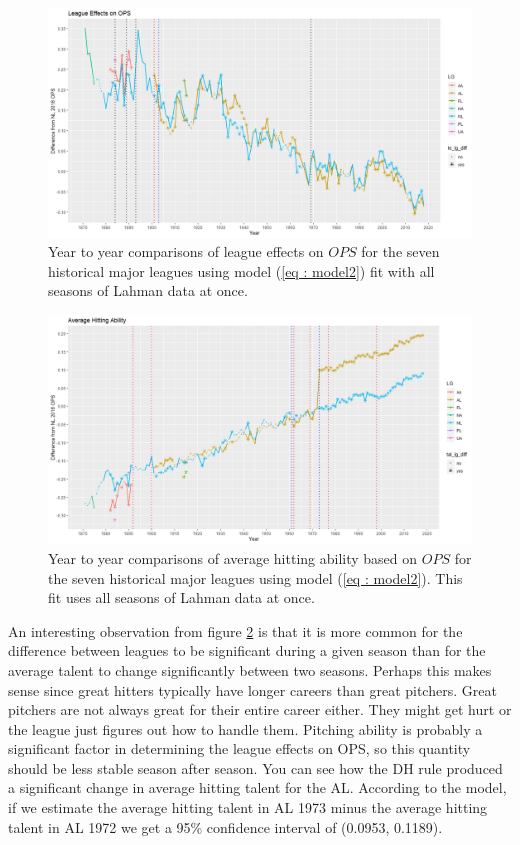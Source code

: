 \documentclass [52pt] {article}
\begin{document}
\\\\
\begin{figure}[h!]
\centering
\includegraphics[scale = 0.5]{PlyrEffReg_MLB_LEplot.png}
\caption{\label{fig : plyrlg_LE2} Year to year comparisons of league effects on $OPS$ for the seven historical major leagues using model (\ref{eq : model2}) fit with all seasons of Lahman data at once.  }
\end{figure}
\begin{figure}[h!]
\centering
\includegraphics[scale = 0.5]{PlyrEffReg_MLB_HAplot.png}
\caption{\label{fig : plyrlg_HA2} Year to year comparisons of average hitting ability based on $OPS$ for the seven historical major leagues using model (\ref{eq : model2}).  This fit uses all seasons of Lahman data at once.}
\end{figure}
\noindent An interesting observation from figure \ref{fig : plyrlg_HA2} is that it is more common for the difference between leagues to be significant during a given season than for the average talent to change significantly between two seasons.  Perhaps this makes sense since great hitters typically have longer careers than great pitchers.  Great pitchers are not always great for their entire career either.  They might get hurt or the league just figures out how to handle them.  Pitching ability is probably a significant factor in determining the league effects on OPS, so this quantity should be less stable season after season.  You can see how the DH rule produced a significant change in average hitting talent for the AL.  According to the model, if we estimate the average hitting talent in AL 1973 minus the average hitting talent in AL 1972 we get a 95\% confidence interval of (0.0953, 0.1189).
\end{document}
